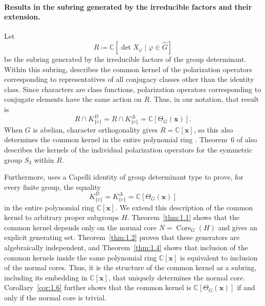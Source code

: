 \documentclass[12pt,a4paper]{article}
\theoremstyle{definition}
\numberwithin{definition}{section}
\DeclareMathOperator{\Core}{Core}
\begin{document}
\paragraph{Results in the subring generated by the irreducible factors and their extension.}
Let
\[
R\coloneqq\mathbb C[\det X_\varphi\mid\varphi\in\widehat G]
\]
be the subring generated by the irreducible factors of the group determinant.
Within this subring, \cite[Theorem~2]{Yamaguchi13022026} describes the common
kernel of the polarization operators corresponding to representatives of
all conjugacy classes other than the identity class.
Since characters are class functions, polarization operators corresponding
to conjugate elements have the same action on $R$.
Thus, in our notation, that result is
\[
R\cap K_{\{e\}}^D
=R\cap K_{\{e\}}^\Delta
=\mathbb C[\Theta_G(\bm x)].
\]
When $G$ is abelian, character orthogonality gives $R=\mathbb C[\bm x]$,
so this also determines the common kernel in the entire polynomial ring
\cite[Corollary~3]{Yamaguchi13022026}.
Theorem~6 of \cite{Yamaguchi13022026} also describes the kernels of the
individual polarization operators for the symmetric group $S_3$ within $R$.

Furthermore, \cite[Theorem~1]{YI2026} uses a Capelli identity of group
determinant type to prove, for every finite group, the equality
\[
K_{\{e\}}^D
=K_{\{e\}}^\Delta
=\mathbb C[\Theta_G(\bm x)]
\]
in the entire polynomial ring $\mathbb C[\bm x]$.
We extend this description of the common kernel to arbitrary proper
subgroups $H$.
Theorem~\ref{thm:1.1} shows that the common kernel depends only on the
normal core $N=\Core_G(H)$ and gives an explicit generating set.
Theorem~\ref{thm:1.2} proves that these generators are algebraically
independent, and Theorem~\ref{thm:1.4} shows that inclusion of the common
kernels inside the same polynomial ring $\mathbb C[\bm x]$ is equivalent
to inclusion of the normal cores.
Thus, it is the structure of the common kernel as a subring, including its
embedding in $\mathbb C[\bm x]$, that uniquely determines the normal core.
Corollary~\ref{cor:1.6} further shows that the common kernel is
$\mathbb C[\Theta_G(\bm x)]$ if and only if the normal core is trivial.
\end{document}
